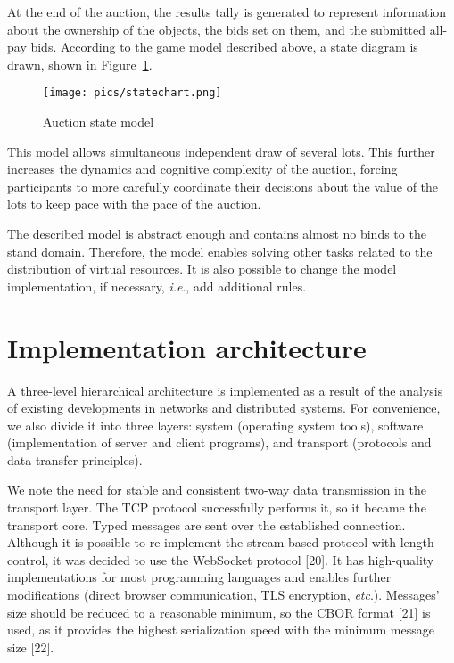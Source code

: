 \documentclass[
]{ceurart}
\begin{document}
At the end of the auction, the results tally is generated to represent information about the ownership of the objects, the bids set on them, and the submitted all-pay bids.
According to the game model described above, a state diagram is drawn, shown in Figure~\ref{fig:1}.
\begin{figure}
  \centering
  \texttt{[image: pics/statechart.png]}
  \caption{Auction state model}
  \label{fig:1}
\end{figure}
This model allows simultaneous independent draw of several lots. This further increases the dynamics and cognitive complexity of the auction, forcing participants to more carefully coordinate their decisions about the value of the lots to keep pace with the pace of the auction.

The described model is abstract enough and contains almost no binds to the stand domain. Therefore, the model enables solving other tasks related to the distribution of virtual resources. It is also possible to change the model implementation, if necessary, \emph{i.e}., add additional rules.

\section{Implementation architecture}
\label{sec:impl-arch}

A three-level hierarchical architecture is implemented as a result of the analysis of existing developments in networks and distributed systems. For convenience, we also divide it into three layers: system (operating system tools), software (implementation of server and client programs), and transport (protocols and data transfer principles).

We note the need for stable and consistent two-way data transmission in the transport layer. The TCP protocol successfully performs it, so it became the transport core. Typed messages are sent over the established connection. Although it is possible to re-implement the stream-based protocol with length control, it was decided to use the WebSocket protocol [20]. It has high-quality implementations for most programming languages and enables further modifications (direct browser communication, TLS encryption, \emph{etc}.). Messages' size should be reduced to a reasonable minimum, so the CBOR format [21] is used, as it provides the highest serialization speed with the minimum message size [22].
\end{document}
